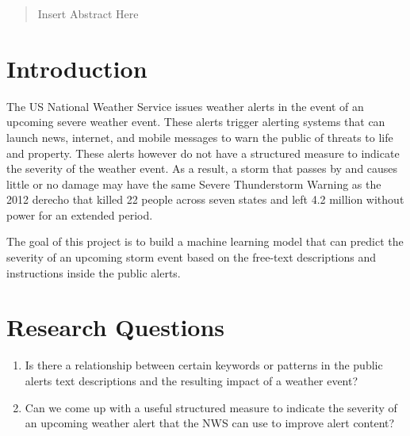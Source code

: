 \documentclass{article}
\begin{document}
 


\begin{abstract} 
Insert Abstract Here
\end{abstract} 

\section{Introduction}
\label{introduction}
The US National Weather Service issues weather alerts in the event of an upcoming severe weather event. These alerts trigger alerting systems that can launch news, internet, and mobile messages to warn the public of threats to life and property. These alerts however do not have a structured measure to indicate the severity of the weather event. As a result, a storm that passes by and causes little or no damage may have the same Severe Thunderstorm Warning as the 2012 derecho that killed 22 people across seven states and left 4.2 million without power for an extended period.

The goal of this project is to build a machine learning model that can predict the severity of an upcoming storm event based on the free-text descriptions and instructions inside the public alerts. 

\section{Research Questions} 
\label{researchquestions}
\begin{enumerate}
\item
Is there a relationship between certain keywords or patterns in the public alerts text descriptions and the resulting impact of a weather event?
\item 
Can we come up with a useful structured measure to indicate the severity of an upcoming weather alert that the NWS can use to improve alert content?
\end{enumerate}
\end{document}
